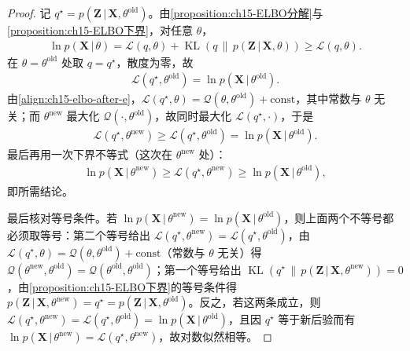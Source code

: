 \documentclass[../../main.tex]{subfiles}
\begin{document}
\begin{proof}
记 $q^\star=p(\bm{Z}\,|\,\bm{X},\theta^{\text{old}})$。由\cref{proposition:ch15-ELBO分解}与\cref{proposition:ch15-ELBO下界}，对任意 $\theta$，
\begin{align*}
\ln p(\bm{X}\,|\,\theta)=\mathcal{L}(q,\theta)+\operatorname{KL}\!\left(q\,\|\,p(\bm{Z}\,|\,\bm{X},\theta)\right)\geqslant\mathcal{L}(q,\theta).
\end{align*}
在 $\theta=\theta^{\text{old}}$ 处取 $q=q^\star$，散度为零，故
\begin{align*}
\mathcal{L}(q^\star,\theta^{\text{old}})=\ln p(\bm{X}\,|\,\theta^{\text{old}}).
\end{align*}
由\eqref{align:ch15-elbo-after-e}，$\mathcal{L}(q^\star,\theta)=\mathcal{Q}(\theta,\theta^{\text{old}})+\text{const}$，其中常数与 $\theta$ 无关；而 $\theta^{\text{new}}$ 最大化 $\mathcal{Q}(\cdot,\theta^{\text{old}})$，故同时最大化 $\mathcal{L}(q^\star,\cdot)$，于是
\begin{align*}
\mathcal{L}(q^\star,\theta^{\text{new}})\geqslant\mathcal{L}(q^\star,\theta^{\text{old}})=\ln p(\bm{X}\,|\,\theta^{\text{old}}).
\end{align*}
最后再用一次下界不等式（这次在 $\theta^{\text{new}}$ 处）：
\begin{align*}
\ln p(\bm{X}\,|\,\theta^{\text{new}})\geqslant\mathcal{L}(q^\star,\theta^{\text{new}})\geqslant\ln p(\bm{X}\,|\,\theta^{\text{old}}),
\end{align*}
即所需结论。

最后核对等号条件。若 $\ln p(\bm{X}\,|\,\theta^{\text{new}})=\ln p(\bm{X}\,|\,\theta^{\text{old}})$，则上面两个不等号都必须取等号：第二个等号给出 $\mathcal{L}(q^\star,\theta^{\text{new}})=\mathcal{L}(q^\star,\theta^{\text{old}})$，由 $\mathcal{L}(q^\star,\theta)=\mathcal{Q}(\theta,\theta^{\text{old}})+\text{const}$（常数与 $\theta$ 无关）得 $\mathcal{Q}(\theta^{\text{new}},\theta^{\text{old}})=\mathcal{Q}(\theta^{\text{old}},\theta^{\text{old}})$；第一个等号给出 $\operatorname{KL}(q^\star\,\|\,p(\bm{Z}\,|\,\bm{X},\theta^{\text{new}}))=0$，由\cref{proposition:ch15-ELBO下界}的等号条件得 $p(\bm{Z}\,|\,\bm{X},\theta^{\text{new}})=q^\star=p(\bm{Z}\,|\,\bm{X},\theta^{\text{old}})$。反之，若这两条成立，则 $\mathcal{L}(q^\star,\theta^{\text{new}})=\mathcal{L}(q^\star,\theta^{\text{old}})=\ln p(\bm{X}\,|\,\theta^{\text{old}})$，且因 $q^\star$ 等于新后验而有 $\ln p(\bm{X}\,|\,\theta^{\text{new}})=\mathcal{L}(q^\star,\theta^{\text{new}})$，故对数似然相等。
\end{proof}
\end{document}
